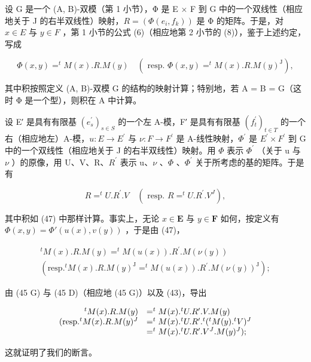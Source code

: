 设 G 是一个 (A, B)-双模（第 1 小节），Φ 是 E × F 到 G 中的一个双线性（相应地关于 J 的右半双线性）映射，\(R = (\Phi(e_i, f_k))\) 是 Φ 的矩阵。于是，对 \(x \in E\) 与 \(y \in F\) ，第 1 小节的公式 (6)（相应地第 2 小节的 (8)），鉴于上述约定，写成

\[
\Phi (x, y) = ^ {t} M (x). R. M (y) \quad (\text { resp. } \Phi (x, y) = ^ {t} M (x). R. M (y) ^ {\mathrm{J}}),\tag{47}
\]

其中积按照定义 (A, B)-双模 G 的结构的映射计算；特别地，若 A = B = G（这时 Φ 是一个型），则积在 A 中计算。

设 E′ 是具有有限基 \((e_{s}^{\prime})_{s\in S}\) 的一个左 A-模，F′ 是具有有限基 \((f_{t}^{\prime})_{t\in T}\) 的一个右（相应地左）A-模，\(u:E\to E^{\prime}\) 与 \(\nu:F\to F^{\prime}\) 是 A-线性映射，\(\Phi^{\prime}\) 是 \(E^{\prime}\times F^{\prime}\) 到 G 中的一个双线性（相应地关于 J 的右半双线性）映射。用 \(\Phi\) 表示 \(\Phi^{\prime}\) （关于 u 与 \(\nu\) ）的原像，用 U、V、R、\(R^{\prime}\) 表示 u、\(\nu\) 、\(\Phi\) 、\(\Phi^{\prime}\) 关于所考虑的基的矩阵。于是有

\[
R = ^ {t} U. R ^ {\prime}. V \quad (\text { resp. } R = ^ {t} U. R ^ {\prime}. V ^ {J}),\tag{48}
\]

其中积如 (47) 中那样计算。事实上，无论 \(x \in \mathbf{E}\) 与 \(y \in \mathbf{F}\) 如何，按定义有 \(\Phi(x, y) = \Phi'(u(x), v(y))\) ，于是由 (47)，

\[
\begin{array}{c} ^ {t} M (x). R. M (y) = ^ {t} M (u (x)). R ^ {\prime}. M (\nu (y)) \\ (\text {resp.} ^ {t} M (x). R. M (y) ^ {\mathrm{J}} = ^ {t} M (u (x)). R ^ {\prime}. M (\nu (y)) ^ {\mathrm{J}}); \end{array}
\]

由 (45 G) 与 (45 D)（相应地 (45 G)）以及 (43)，导出

\[
\begin{array}{r l} ^ {t} M (x). R. M (y) & = ^ {t} M (x). ^ {t} U. R ^ {\prime}. V. M (y) \\ (\text {resp.} ^ {t} M (x). R. M (y) ^ {J} & = ^ {t} M (x). ^ {t} U. R ^ {\prime}. ^ {t} (^ {t} M (y). ^ {t} V) ^ {J} \\ & = ^ {t} M (x). ^ {t} U. R ^ {\prime}. V ^ {J}. M (y) ^ {J}); \end{array}
\]

这就证明了我们的断言。

